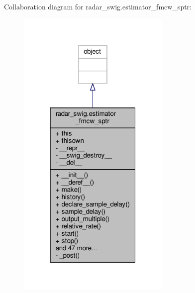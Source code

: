 Collaboration diagram for radar\+\_\+swig.\+estimator\+\_\+fmcw\+\_\+sptr\+:
\nopagebreak
\begin{figure}[H]
\begin{center}
\leavevmode
\includegraphics[width=208pt]{da/d6e/classradar__swig_1_1estimator__fmcw__sptr__coll__graph}
\end{center}
\end{figure}
